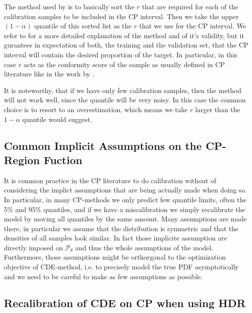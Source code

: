 The method used by \cite{sesia2021conformal, chernozhukov2021distributional} is to basically sort the $r$ that are required for each of the calibration samples to be included in the CP interval. Then we take the upper $(1- \alpha)$ quantile of this sorted list as the $r$ that we use for the CP interval. We refer to \cite{sesia2021conformal} for a more detailed explanation of the method and of it's validity, but it gurantees in expectation of both, the training and the validation set, that the CP interval will contain the desired proportion of the target. In particular, in this case $r$ acts as the conformity score of the sample as usually defined in CP literature like in the work by \cite{sesia2021conformal}.

It is noteworthy, that if we have only few calibration samples, then the method will not work well, since the quantile will be very noisy. In this case the common choice is to resort to an overestimation, which means we take $r$ larger than the $1-\alpha$ quantile would suggest.

\subsection{Common Implicit Assumptions on the CP-Region Fuction}\label{sec:implicit_assumptions_cp}

It is common practice in the CP literature to do calibration without of considering the implict assumptions that are being actually made when doing so. In particular, in many CP-methods we only predict few quantile limits, often the 5\% and 95\% quantiles, and if we have a miscalibration we simply recalibrate the model by moving all quantiles by the same amount. Many assumptions are made there, in particular we assume that the distribution is symmetric and that the densities of all samples look similar. In fact those implicite assumption are directly imposed on $\mathcal{P}_{\theta}$ and thus the whole assumptions of the model. Furthermore, those assumptions might be orthorgonal to the optimization objective of CDE-method, i.e. to precisely model the true PDF asymptotically and we need to be careful to make as few assumptions as possible.

\subsection{Recalibration of CDE on CP when using HDR}


